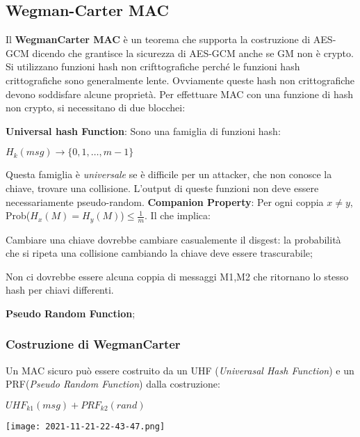 \documentclass{article}
\theoremstyle{remark}
\begin{document}
\subsection{Wegman-Carter MAC}
Il \textbf{WegmanCarter MAC} è un teorema che supporta la costruzione di AES-GCM dicendo che grantisce la sicurezza di AES-GCM anche se GM non è crypto.
Si utilizzano funzioni hash non crifttografiche perché le funzioni hash crittografiche sono generalmente lente.\newline
Ovviamente queste hash non crittografiche devono soddisfare alcune proprietà. Per effettuare MAC con una funzione di hash non crypto, si necessitano di
due blocchei:
\begin{itemize}
	\item \textbf{Universal hash Function}:
	      Sono una famiglia di funzioni hash:
	      \begin{center}
		      \(H_k(msg)\rightarrow\{0,1,\dots,m-1\}\)
	      \end{center}
	      Questa famiglia è \emph{universale} se è difficile per un attacker, che
	      non conosce la chiave, trovare una collisione. L'output di queste funzioni non deve essere necessariamente pseudo-random.\newline
	      \textbf{Companion Property}: Per ogni coppia \(x\neq y\), Prob(\(H_x(M)=H_y(M)\))\(\leq \frac{1}{m}\). Il che implica:
	      \begin{center}
		      \item Cambiare una chiave dovrebbe cambiare casualemente il disgest: la probabilità che si ripeta una collisione cambiando la chiave
		      deve essere trascurabile;
		      \item Non ci dovrebbe essere alcuna coppia di messaggi M1,M2 che ritornano lo stesso hash per chiavi differenti.
	      \end{center}
	\item \textbf{Pseudo Random Function};
\end{itemize}
\subsubsection{Costruzione di WegmanCarter}
Un MAC sicuro può essere costruito da un UHF (\emph{Univerasal Hash Function}) e un PRF(\emph{Pseudo Random Function}) dalla costruzione:
\begin{center}
	\(UHF_{k1}(msg)+PRF_{k2}(rand)\)
\end{center}
\begin{center}
	\texttt{[image: 2021-11-21-22-43-47.png]}
\end{center}
\end{document}
